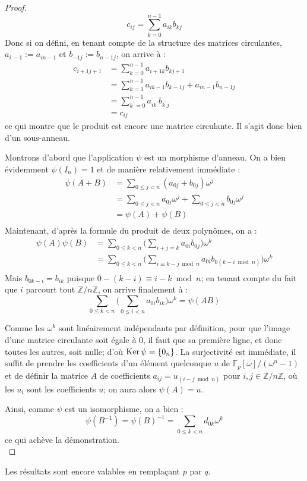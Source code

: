\documentclass[a4paper]{article} %
\numberwithin{equation}{section}
\newcommand\zmodn[1]{\mathbb{Z}/#1\mathbb{Z}}
\newcommand\GF[1]{\mathbb{F}_{#1}}
\begin{document}
\begin{proof}
\[c_{ij} = \sum_{k=0}^{n-1}{a_{ik}b_{kj}}\]
Donc si on défini, en tenant compte de la structure des matrices circulantes, $a_{i\,-1} := a_{in-1}$ et $b_{-1j} := b_{n-1j}$, on arrive à :
\begin{align*}
c_{i+1j+1} &= \sum_{k=0}^{n-1}{a_{i+1k}b_{kj+1}}\\
&= \sum_{k=1}^{n-1}{a_{ik-1}b_{k-1j}} + a_{in-1}b_{n-1j}\\
&= \sum_{k^{\prime}=0}^{n-1}{a_{ik^{\prime}}b_{k^{\prime}j}}\\
&= c_{ij}
\end{align*}
ce qui montre que le produit est encore une matrice circulante. Il s'agit donc bien d'un sous-anneau.\par
Montrons d'abord que l'application $\psi$ est un morphisme d'anneau. On a bien évidemment $\psi(I_n) = 1$ et de manière relativement immédiate :
\begin{align*}
\psi(A + B) &= \sum_{0\leq j < n}{(a_{0j} + b_{0j})\omega^j}\\
&= \sum_{0\leq j < n}{a_{0j}\omega^j} + \sum_{0\leq j < n}{b_{0j}\omega^j}\\
&= \psi(A) + \psi(B)\\
\end{align*}
Maintenant, d'après la formule du produit de deux polynômes, on a :
\begin{align*}
\psi(A)\psi(B) &= \sum_{0\leq k < n}{\bigg(\sum_{i+j=k}{a_{0i}b_{0j}}\bigg)\omega^k}\\
&= \sum_{0\leq k < n}{\bigg(\sum_{i\equiv k-j \bmod n}{a_{0i}b_{0(k-i \bmod n)}}\bigg)\omega^k}\\
\end{align*}
Mais $b_{0k-i} = b_{ik}$ puisque $0 -(k-i) \equiv i-k \bmod n$; en tenant compte du fait que $i$ parcourt tout $\zmodn{n}$, on arrive finalement à :
\[\sum_{0\leq k < n}{\bigg(\sum_{0\leq i < n}{a_{0i}b_{ik}}\bigg)\omega^k} = \psi(AB)\]\par
Comme les $\omega^k$ sont linéairement indépendants par définition, pour que l'image d'une matrice circulante soit égale à $0$, il faut que sa première ligne, et donc toutes les autres, soit nulle; d'où $\textup{Ker}\,\psi = \{0_n\}$. La surjectivité est immédiate, il suffit de prendre les coefficients d'un élément quelconque $u$ de $\GF{p}[\omega]/(\omega^n - 1)$ et de définir la matrice $A$ de coefficients $a_{ij} = u_{(i-j \bmod n)}$ pour $i,j\in\zmodn{n}$, où les $u_i$ sont les coefficients $u$; on aura alors $\psi(A) = u$.\\\par
Ainsi, comme $\psi$ est un isomorphisme, on a bien :
\[\psi(B^{-1}) = \psi(B)^{-1} = \sum_{0\leq k < n}{d_{0k}\omega^k}\]
ce qui achève la démonstration.\\
\end{proof}
\begin{rem}
Les résultats sont encore valables en remplaçant $p$ par $q$.
\end{rem}
\end{document}
